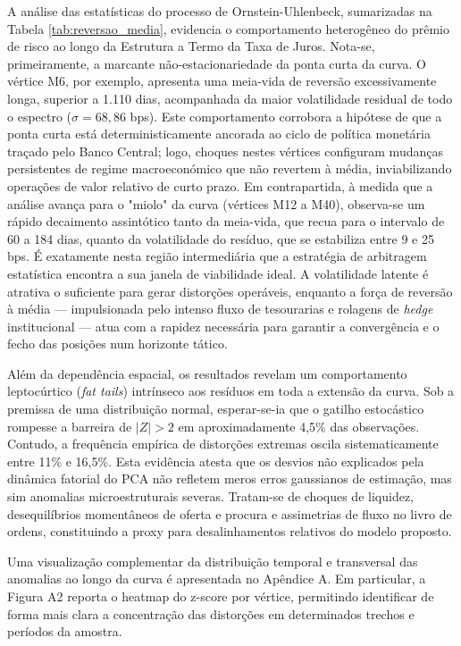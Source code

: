 \documentclass[fleqn]{rbfin}
\begin{document}
A análise das estatísticas do processo de Ornstein-Uhlenbeck, sumarizadas na Tabela \ref{tab:reversao_media}, evidencia o comportamento heterogêneo do prêmio de risco ao longo da Estrutura a Termo da Taxa de Juros. Nota-se, primeiramente, a marcante não-estacionariedade da ponta curta da curva. O vértice M6, por exemplo, apresenta uma meia-vida de reversão excessivamente longa, superior a 1.110 dias, acompanhada da maior volatilidade residual de todo o espectro ($\sigma = 68,86$ bps). Este comportamento corrobora a hipótese de que a ponta curta está deterministicamente ancorada ao ciclo de política monetária traçado pelo Banco Central; logo, choques nestes vértices configuram mudanças persistentes de regime macroeconómico que não revertem à média, inviabilizando operações de valor relativo de curto prazo. Em contrapartida, à medida que a análise avança para o "miolo" da curva (vértices M12 a M40), observa-se um rápido decaimento assintótico tanto da meia-vida, que recua para o intervalo de 60 a 184 dias, quanto da volatilidade do resíduo, que se estabiliza entre 9 e 25 bps. É exatamente nesta região intermediária que a estratégia de arbitragem estatística encontra a sua janela de viabilidade ideal. A volatilidade latente é atrativa o suficiente para gerar distorções operáveis, enquanto a força de reversão à média — impulsionada pelo intenso fluxo de tesourarias e rolagens de \textit{hedge} institucional — atua com a rapidez necessária para garantir a convergência e o fecho das posições num horizonte tático.

Além da dependência espacial, os resultados revelam um comportamento leptocúrtico (\textit{fat tails}) intrínseco aos resíduos em toda a extensão da curva. Sob a premissa de uma distribuição normal, esperar-se-ia que o gatilho estocástico rompesse a barreira de $|Z| > 2$ em aproximadamente 4,5\% das observações. Contudo, a frequência empírica de distorções extremas oscila sistematicamente entre 11\% e 16,5\%. Esta evidência atesta que os desvios não explicados pela dinâmica fatorial do PCA não refletem meros erros gaussianos de estimação, mas sim anomalias microestruturais severas. Tratam-se de choques de liquidez, desequilíbrios momentâneos de oferta e procura e assimetrias de fluxo no livro de ordens, constituindo a proxy para desalinhamentos relativos do modelo proposto.

Uma visualização complementar da distribuição temporal e transversal das anomalias ao longo da curva é apresentada no Apêndice A. Em particular, a Figura A2 reporta o heatmap do z-score por vértice, permitindo identificar de forma mais clara a concentração das distorções em determinados trechos e períodos da amostra.
\end{document}
